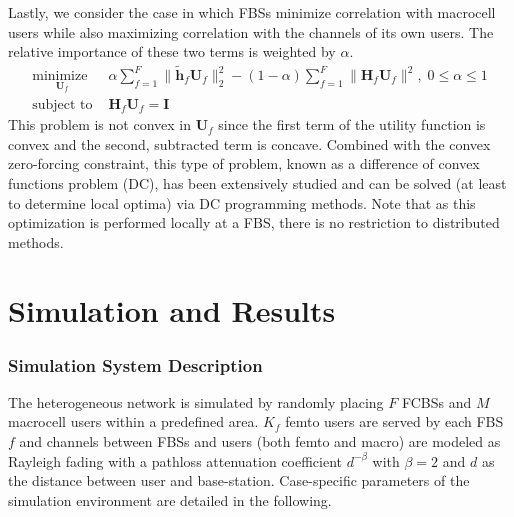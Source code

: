 \par
Lastly, we consider the case in which FBSs minimize correlation with macrocell users while also maximizing correlation with the channels of its own users. The relative importance of these two terms is weighted by $\alpha.$
    \begin{equation}
    \begin{array}{ll}
    \underset{\mathbf{U}_{f} }{\text{minimize }}   & \alpha\sum^F_{f=1} \|\tilde{\mathbf{h}}_{f}  \mathbf{U}_{f}\|^2_2
    -
    (1-\alpha)\sum^F_{f=1} \|\mathbf{H}_{f}  \mathbf{U}_{f}\|^2, \; 0\leq \alpha \leq 1
    \\
    \mbox{subject to } & \mathbf{H}_{f}  \mathbf{U}_{f} = \mathbf{I}
    \end{array}
    \label{e-opt-prob}
    \end{equation}
    This problem is not convex in $\mathbf{U}_{f}$ since the first term of the utility function is convex and the second, subtracted term is concave. Combined with the convex zero-forcing constraint, this type of problem, known as a difference of convex functions problem (DC), has been extensively studied and can be solved (at least to determine local optima) via DC programming methods. Note that as this optimization is performed locally at a FBS, there is no restriction to distributed methods.
     


\chapter{Simulation and Results}\label{numerical}
\subsection{Simulation System Description}
The heterogeneous network is simulated by randomly placing $F$ FCBSs and $M$ macrocell users within a predefined area. $K_{f}$ femto users are served by each FBS $f$ and channels between FBSs and users (both femto and macro) are modeled as Rayleigh fading with a pathloss attenuation coefficient $d^{- \beta}$ with $\beta=2$ and $d$ as the distance between user and base-station. Case-specific parameters of the simulation environment are detailed in the following.


